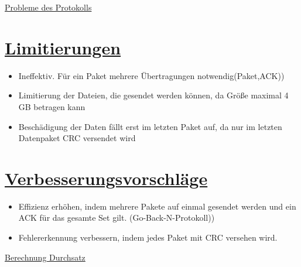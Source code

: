 \documentclass[12pt]{article}
\begin{document}
\vspace*{\fill}
\pagebreak

\begin{center}
{\Huge \underline {Probleme des Protokolls}}
\end{center}
\par

\vspace*{10mm}

\section*{\Large \underline {Limitierungen}}
\vspace {5mm}

\begin{itemize}
  \item{Ineffektiv. Für ein Paket mehrere Übertragungen notwendig(Paket,ACK))} \\
  \item{Limitierung der Dateien, die gesendet werden können, da Größe maximal 4 GB betragen kann} \\
  \item{Beschädigung der Daten fällt erst im letzten Paket auf, da nur im letzten Datenpaket CRC versendet wird}
\end{itemize}

\section*{\Large \underline {Verbesserungsvorschläge}}
\vspace {5mm}
\begin{itemize}
  \item{Effizienz erhöhen, indem mehrere Pakete auf einmal gesendet werden und ein ACK für das gesamte Set gilt. (Go-Back-N-Protokoll))}
  \item{Fehlererkennung verbessern, indem jedes Paket mit CRC versehen wird.}
\end{itemize}
\vspace*{\fill}

\pagebreak

\begin{center}
{\Huge \underline {Berechnung Durchsatz}}
\end{center}
\vspace*{10mm}

\\
\end{document}
